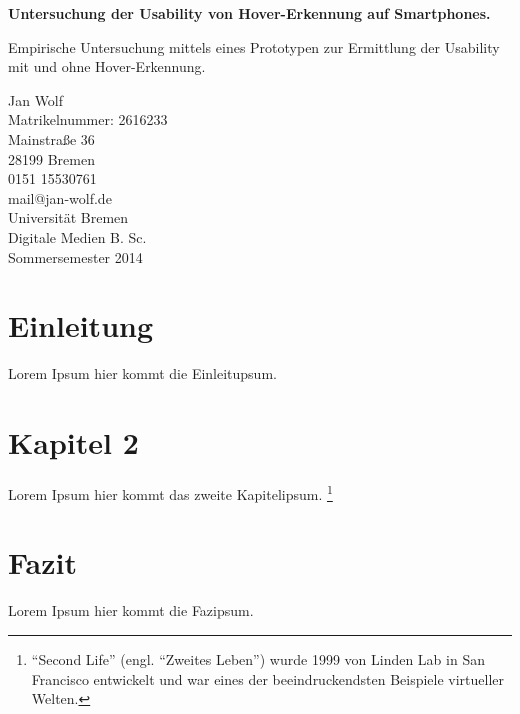 \documentclass[a4paper,12pt,bibliography=totoc]{scrreprt}%
\begin{document}
\begin{titlepage}
\begin{center}
\null
\vfill
\begin{Large}
\textsf{\textbf{Untersuchung der Usability von Hover-Erkennung auf Smartphones.}}
\end{Large}\linebreak \linebreak 
\begin{large}
\textsf{Empirische Untersuchung mittels eines Prototypen zur Ermittlung der Usability mit und ohne Hover-Erkennung.}
\end{large}
\begin{small}
\vfill{Jan Wolf \\ Matrikelnummer: 2616233 \\ Mainstraße 36 \\  28199 Bremen \\ 0151 15530761\\ mail@jan-wolf.de \\\vspace{3cm} Universität Bremen\\ Digitale Medien B. Sc. \\ Sommersemester 2014}
\null
\end{small}
\end{center}
\end{titlepage}

\tableofcontents
\thispagestyle{empty}
\clearpage
\onehalfspacing
\pagestyle{plain}

\chapter{Einleitung}
Lorem Ipsum hier kommt die Einleitupsum.
\chapter{Kapitel 2}
Lorem Ipsum hier kommt das zweite Kapitelipsum.
\footnote{"`Second Life"' (engl. "`Zweites Leben"') wurde 1999 von Linden Lab in San Francisco entwickelt und war eines der beeindruckendsten Beispiele virtueller Welten.}
\chapter{Fazit}
Lorem Ipsum hier kommt die Fazipsum.
\end{document}

